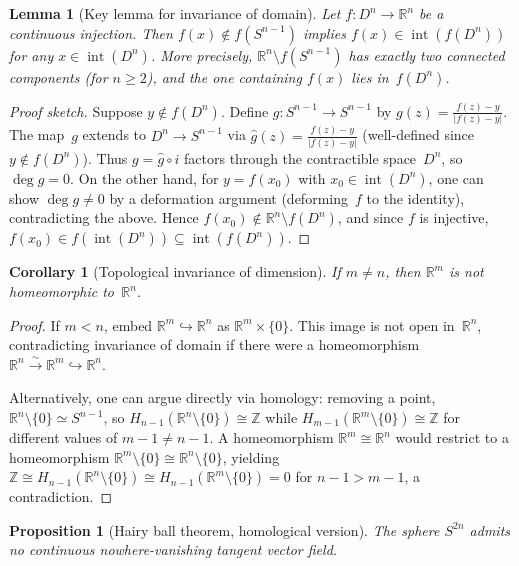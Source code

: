\documentclass[12pt,a4paper,openany]{book}
\theoremstyle{definition}
\theoremstyle{plain}
\newtheorem{proposition}[definition]{Proposition}
\newtheorem{lemma}[definition]{Lemma}
\newtheorem{corollary}[definition]{Corollary}
\theoremstyle{remark}
\newcommand{\Z}{\mathbb{Z}}
\newcommand{\R}{\mathbb{R}}
\newcommand{\abs}[1]{\left|#1\right|}
\begin{document}
\begin{lemma}[Key lemma for invariance of domain]\label{lem:invariance-key}
Let $f\colon D^n\to\R^n$ be a continuous injection.  Then $f(x)\notin
f(S^{n-1})$ implies $f(x)\in\operatorname{int}(f(D^n))$ for any
$x\in\operatorname{int}(D^n)$.  More precisely,
$\R^n\setminus f(S^{n-1})$ has exactly two connected components (for
$n\ge 2$), and the one containing $f(x)$ lies in~$f(D^n)$.
\end{lemma}

\begin{proof}[Proof sketch]
Suppose $y\notin f(D^n)$.  Define
$g\colon S^{n-1}\to S^{n-1}$ by
$g(z)=\frac{f(z)-y}{\abs{f(z)-y}}$.
The map~$g$ extends to $D^n\to S^{n-1}$ via
$\hat{g}(z)=\frac{f(z)-y}{\abs{f(z)-y}}$ (well-defined since $y\notin f(D^n)$).
Thus $g=\hat{g}\circ i$ factors through the contractible space~$D^n$,
so $\deg g=0$.  On the other hand, for $y=f(x_0)$ with
$x_0\in\operatorname{int}(D^n)$, one can show $\deg g\ne 0$ by a
deformation argument (deforming~$f$ to the identity), contradicting the
above.  Hence $f(x_0)\notin\R^n\setminus f(D^n)$, and since $f$ is
injective, $f(x_0)\in f(\operatorname{int}(D^n))\subseteq\operatorname{int}(f(D^n))$.
\end{proof}

\begin{corollary}[Topological invariance of dimension]\label{cor:invariance-dimension}
If $m\ne n$, then $\R^m$ is not homeomorphic to~$\R^n$.
\end{corollary}

\begin{proof}
If $m<n$, embed $\R^m\hookrightarrow\R^n$ as $\R^m\times\{0\}$.  This image
is not open in~$\R^n$, contradicting invariance of domain if there
were a homeomorphism $\R^n\xrightarrow{\sim}\R^m\hookrightarrow\R^n$.

Alternatively, one can argue directly via homology: removing a point,
$\R^n\setminus\{0\}\simeq S^{n-1}$, so $H_{n-1}(\R^n\setminus\{0\})\cong\Z$
while $H_{m-1}(\R^m\setminus\{0\})\cong\Z$ for different values of
$m-1\ne n-1$.  A homeomorphism $\R^m\cong\R^n$ would restrict to a
homeomorphism $\R^m\setminus\{0\}\cong\R^n\setminus\{0\}$, yielding
$\Z\cong H_{n-1}(\R^n\setminus\{0\})\cong H_{n-1}(\R^m\setminus\{0\})=0$
for $n-1>m-1$, a contradiction.
\end{proof}

\begin{proposition}[Hairy ball theorem, homological version]\label{prop:hairy-ball}
The sphere $S^{2n}$ admits no continuous nowhere-vanishing tangent
vector field.
\end{proposition}
\end{document}
